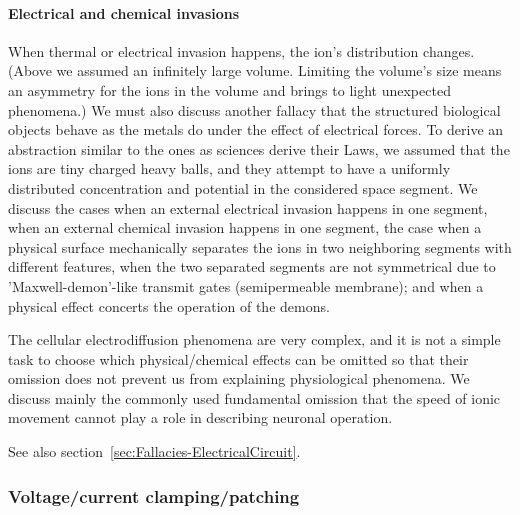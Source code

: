  
 \paragraph{Electrical and chemical invasions\label{sec:Physics-Invasions}}
When thermal or electrical invasion happens, the ion's distribution changes.
(Above we assumed an infinitely large volume. Limiting the volume's size
means an asymmetry for the ions in the volume and brings to light
unexpected phenomena.)
We must also discuss another fallacy that the
structured biological objects behave as the metals do under the effect
of electrical forces. To derive an abstraction similar to the ones as
sciences derive their Laws, we assumed that the ions are tiny charged heavy
balls, and they attempt to have a uniformly distributed concentration
and potential in the considered space segment. We discuss the cases
when an external electrical invasion happens in one segment, when an
external chemical invasion happens in one segment, the case when a
physical surface mechanically separates the ions in two neighboring
segments with different features, when the two separated segments
are not symmetrical due to 'Maxwell-demon'-like transmit gates (semipermeable
membrane); and when a physical effect concerts the operation of the
demons.

The cellular electrodiffusion phenomena are very complex, and it is
not a simple task to choose which physical/chemical effects can be
omitted so that their omission does not prevent us from explaining
physiological phenomena. We discuss mainly the commonly used fundamental
omission that the speed of ionic movement cannot play a role in describing
neuronal operation.

See also section~\ref{sec:Fallacies-ElectricalCircuit}.

\subsubsection[Clamping/patching]{Voltage/current clamping/patching\label{sec:PHYSICS_clamping}}

